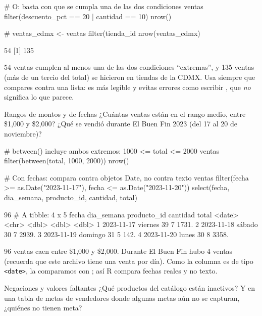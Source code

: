 \begin{rcode}
# O: basta con que se cumpla una de las dos condiciones
ventas %
  filter(descuento_pct == 20 | cantidad == 10) %
  nrow()

# %
ventas_cdmx <- ventas %
  filter(tienda_id %
nrow(ventas_cdmx)
\end{rcode}
\begin{rsalida}
[1] 54
[1] 135
\end{rsalida}

54 ventas cumplen al menos una de las dos condiciones ``extremas'', y
135 ventas (más de un tercio del total) se hicieron en tiendas de la
CDMX. Usa  siempre que compares contra una lista: es más
legible y evitas errores como escribir
, que \emph{no} significa lo que parece.

\begin{ejemplo}{Rangos de montos y de fechas}
¿Cuántas ventas están en el rango medio, entre \$1,000 y \$2,000? ¿Qué se
vendió durante El Buen Fin 2023 (del 17 al 20 de noviembre)?
\end{ejemplo}

\begin{rcode}
# between() incluye ambos extremos: 1000 <= total <= 2000
ventas %
  filter(between(total, 1000, 2000)) %
  nrow()

# Con fechas: compara contra objetos Date, no contra texto
ventas %
  filter(fecha >= as.Date("2023-11-17"),
         fecha <= as.Date("2023-11-20")) %
  select(fecha, dia_semana, producto_id, cantidad, total)
\end{rcode}
\begin{rsalida}
[1] 96
# A tibble: 4 x 5
  fecha      dia_semana producto_id cantidad total
  <date>     <chr>            <dbl>    <dbl> <dbl>
1 2023-11-17 viernes             39        7 1731.
2 2023-11-18 sábado              30        7 2939.
3 2023-11-19 domingo             31        5  142.
4 2023-11-20 lunes               30        8 3358.
\end{rsalida}

96 ventas caen entre \$1,000 y \$2,000. Durante El Buen Fin hubo 4 ventas
(recuerda que este archivo tiene una venta por día). Como la columna
 es de tipo \texttt{<date>}, la comparamos con
; así R compara fechas reales y no texto.

\begin{ejemplo}{Negaciones y valores faltantes}
¿Qué productos del catálogo están inactivos? Y en una tabla de metas de
vendedores donde algunas metas aún no se capturan, ¿quiénes no tienen meta?
\end{ejemplo}

